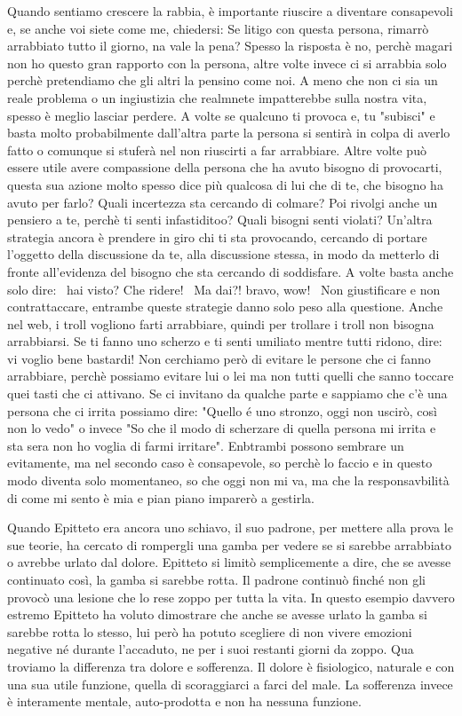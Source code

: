 \documentclass[12pt]{book} %
\begin{document}
Quando sentiamo crescere la rabbia, è importante riuscire a diventare consapevoli e, se anche voi siete come me, chiedersi:
Se litigo con questa persona, rimarrò arrabbiato tutto il giorno, na vale la pena?
Spesso la risposta è no, perchè magari non ho questo gran rapporto con la persona, altre volte invece ci si arrabbia solo perchè pretendiamo che gli altri la pensino come noi. A meno che non ci sia un reale problema o un ingiustizia che realmnete impatterebbe sulla nostra vita, spesso è meglio lasciar perdere. 
A volte se qualcuno ti provoca e, tu "subisci" e basta molto probabilmente dall'altra parte la persona si sentirà in colpa di averlo fatto o comunque si stuferà nel non riuscirti a far arrabbiare. Altre volte può essere utile avere compassione della persona che ha avuto bisogno di provocarti, questa sua azione molto spesso dice più qualcosa di lui che di te, che bisogno ha avuto per farlo? Quali incertezza sta cercando di colmare? Poi rivolgi anche un pensiero a te, perchè ti senti infastiditoo? Quali bisogni senti violati?
Un'altra strategia ancora è prendere in giro chi ti sta provocando, cercando di portare l'oggetto della discussione da te, alla discussione stessa, in modo da metterlo di fronte all'evidenza del bisogno che sta cercando di soddisfare. A volte basta anche solo dire: \
hai visto? Che ridere! \
Ma dai?! bravo, wow! \
Non giustificare e non contrattaccare, entrambe queste strategie danno solo peso alla questione.
Anche nel web, i troll vogliono farti arrabbiare, quindi per trollare i troll non bisogna arrabbiarsi.
Se ti fanno uno scherzo e ti senti umiliato mentre tutti ridono, dire: vi voglio bene bastardi!
Non cerchiamo però di evitare le persone che ci fanno arrabbiare, perchè possiamo evitare lui o lei ma non tutti quelli che sanno toccare quei tasti che ci attivano. Se ci invitano da qualche parte e sappiamo che c'è una persona che ci irrita possiamo dire: "Quello é uno stronzo, oggi non uscirò, così non lo vedo" o invece "So che il modo di scherzare di quella persona mi irrita e sta sera non ho voglia di farmi irritare". Enbtrambi possono sembrare un evitamente, ma nel secondo caso è consapevole, so perchè lo faccio e in questo modo diventa solo momentaneo, so che oggi non mi va, ma che la responsavbilità di come mi sento è mia e pian piano imparerò a gestirla.

Quando Epitteto era ancora uno schiavo, il suo padrone, per mettere alla prova le sue teorie, ha cercato di rompergli
una gamba per vedere se si sarebbe arrabbiato o avrebbe urlato dal dolore. Epitteto si limitò semplicemente a dire, che
se avesse continuato così, la gamba si sarebbe rotta. Il padrone continuò finché non gli provocò una lesione che lo
rese zoppo per tutta la vita. In questo esempio davvero estremo Epitteto ha voluto dimostrare che anche se avesse
urlato la gamba si sarebbe rotta lo stesso, lui però ha potuto scegliere di non vivere emozioni negative né durante
l'accaduto, ne per i suoi restanti giorni da zoppo. Qua troviamo la differenza tra dolore e
sofferenza. Il dolore è fisiologico, naturale e con una sua utile funzione, quella di scoraggiarci a farci del male. La
sofferenza invece è interamente mentale, auto-prodotta e non ha nessuna funzione.
\end{document}
